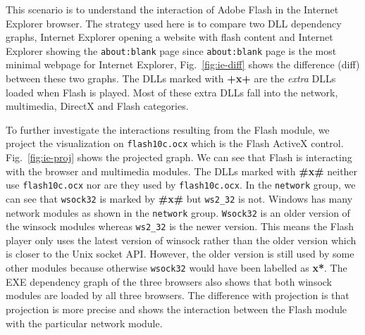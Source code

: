 This scenario is to understand the interaction of Adobe Flash in
the Internet Explorer browser.
The strategy used here is to compare two DLL dependency graphs,
Internet Explorer opening a website with flash content and
Internet Explorer showing the {\tt about:blank} page since
{\tt about:blank} page is the most minimal webpage for Internet Explorer,
Fig.~\ref{fig:ie-diff} shows the difference (diff) between these two
graphs.
The DLLs marked with {\bf +x+} are the {\em extra} DLLs loaded 
when Flash is played.
Most of these extra DLLs fall into the 
network, multimedia, DirectX and Flash categories.

To further investigate the interactions resulting from the Flash module,
we project the visualization on {\tt flash10c.ocx} which is
the Flash ActiveX control.
Fig.~\ref{fig:ie-proj} shows the projected graph.
We can see that Flash is interacting with the browser and multimedia modules.
The DLLs marked with {\bf \#x\#} neither use {\tt flash10c.ocx}
nor are they used by {\tt flash10c.ocx}.
In the {\tt network} group, 
we can see that {\tt wsock32} is marked by {\bf \#x\#} but
{\tt ws2\_32} is not.
Windows has many network modules as shown in the {\tt network} group.
{\tt Wsock32} is an
older version of the winsock modules whereas {\tt ws2\_32} is the newer version.
This means the Flash player only uses the latest version of winsock rather
than the older version which is closer to the Unix socket API.
However, the older version is still used by some other modules
because otherwise {\tt wsock32} would have been labelled as {\bf *x*}.
The EXE dependency graph of the three browsers also shows that
both winsock modules are loaded by all three browsers.
The difference with projection is that projection is
more precise and shows the interaction between
the Flash module with the particular network module.
